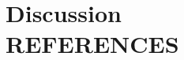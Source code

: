 \documentclass[10pt,conference,compsocconf]{IEEEtran}
\begin{document}
\
%

%



\section{Discussion \\REFERENCES}
\label{sec:discussion}



\end{document}
